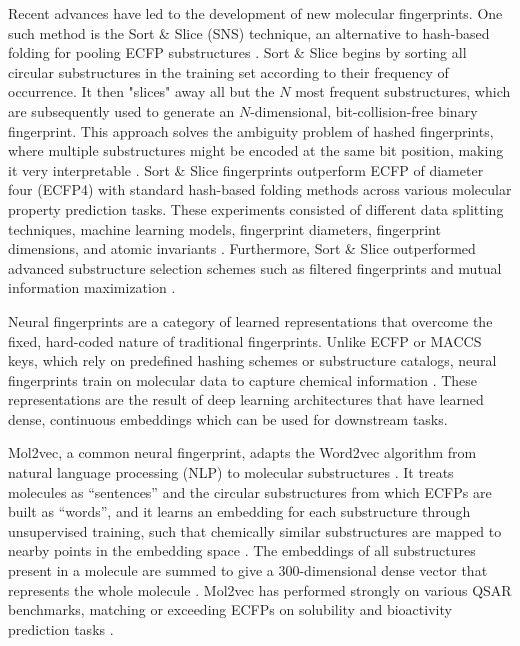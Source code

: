 Recent advances have led to the development of new molecular fingerprints. One such method is the Sort \& Slice (SNS) technique, an alternative to hash-based folding for pooling ECFP substructures \citep{sns}. Sort \& Slice begins by sorting all circular substructures in the training set according to their frequency of occurrence. It then "slices" away all but the $N$ most frequent substructures, which are subsequently used to generate an $N$-dimensional, bit-collision-free binary fingerprint. This approach solves the ambiguity problem of hashed fingerprints, where multiple substructures might be encoded at the same bit position, making it very interpretable \citep{sns}. Sort \& Slice fingerprints outperform ECFP of diameter four (ECFP4) with standard hash-based folding methods across various molecular property prediction tasks. These experiments consisted of different data splitting techniques, machine learning models, fingerprint diameters, fingerprint dimensions, and atomic invariants \citep{sns}. Furthermore, Sort \& Slice outperformed advanced substructure selection schemes such as filtered fingerprints and mutual information maximization \citep{sns}. 


Neural fingerprints are a category of learned  representations that overcome the fixed, hard-coded nature of traditional fingerprints. Unlike ECFP or MACCS keys, which rely on predefined hashing schemes or substructure catalogs, neural fingerprints train on molecular data to capture chemical information \citep{Jaeger2018, Chithrananda2020}. These representations are the result of deep learning architectures that have learned dense, continuous embeddings which can be used for downstream tasks. 

Mol2vec, a common neural fingerprint, adapts the Word2vec algorithm from natural language processing (NLP) to molecular substructures \citep{Jaeger2018}. It treats molecules as ``sentences'' and the circular substructures from which ECFPs are built as ``words'', and it learns an embedding for each substructure through unsupervised training, such that chemically similar substructures are mapped to nearby points in the embedding space \citep{Jaeger2018}. The embeddings of all substructures present in a molecule are summed to give a 300-dimensional dense vector that represents the whole molecule \citep{Jaeger2018}. Mol2vec has performed strongly on various QSAR benchmarks, matching or exceeding ECFPs on solubility and bioactivity prediction tasks \citep{Jaeger2018}.

